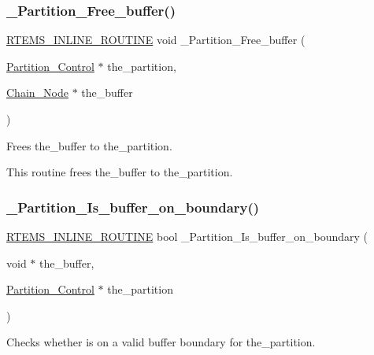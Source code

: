 \subsubsection{\texorpdfstring{\_Partition\_Free\_buffer()}{\_Partition\_Free\_buffer()}}
{\footnotesize\ttfamily \mbox{\hyperlink{group__RTEMSScoreBaseDefs_gac216239df231d5dbd15e3520b0b9313f}{R\+T\+E\+M\+S\+\_\+\+I\+N\+L\+I\+N\+E\+\_\+\+R\+O\+U\+T\+I\+NE}} void \+\_\+\+Partition\+\_\+\+Free\+\_\+buffer (\begin{DoxyParamCaption}\item[{\mbox{\hyperlink{structPartition__Control}{Partition\+\_\+\+Control}} $\ast$}]{the\+\_\+partition,  }\item[{\mbox{\hyperlink{group__RTEMSScoreChain_ga0dd4bfcca1ac7f90de2842e447846d3d}{Chain\+\_\+\+Node}} $\ast$}]{the\+\_\+buffer }\end{DoxyParamCaption})}



Frees the\+\_\+buffer to the\+\_\+partition. 

This routine frees the\+\_\+buffer to the\+\_\+partition. \mbox{\label{group__ClassicPartImpl_gadbd0a0a18e9149e5d8ccf75221fbf2d5}} 
\subsubsection{\texorpdfstring{\_Partition\_Is\_buffer\_on\_boundary()}{\_Partition\_Is\_buffer\_on\_boundary()}}
{\footnotesize\ttfamily \mbox{\hyperlink{group__RTEMSScoreBaseDefs_gac216239df231d5dbd15e3520b0b9313f}{R\+T\+E\+M\+S\+\_\+\+I\+N\+L\+I\+N\+E\+\_\+\+R\+O\+U\+T\+I\+NE}} bool \+\_\+\+Partition\+\_\+\+Is\+\_\+buffer\+\_\+on\+\_\+boundary (\begin{DoxyParamCaption}\item[{void $\ast$}]{the\+\_\+buffer,  }\item[{\mbox{\hyperlink{structPartition__Control}{Partition\+\_\+\+Control}} $\ast$}]{the\+\_\+partition }\end{DoxyParamCaption})}



Checks whether is on a valid buffer boundary for the\+\_\+partition. 

